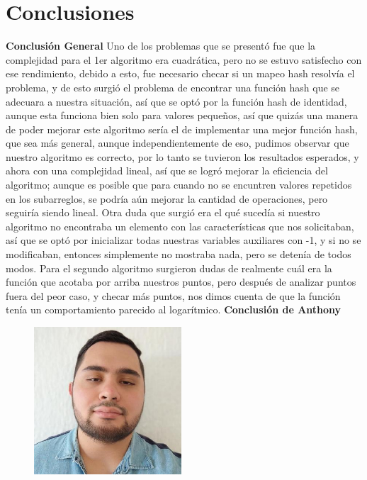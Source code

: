 \documentclass[12pt,twoside]{article}
\begin{document}
\section{Conclusiones}
\textbf{Conclusi\'on General}
\newline
Uno de los problemas que se present\'o fue que la complejidad para el 1er algoritmo era cuadr\'atica, pero no se estuvo satisfecho con ese rendimiento, debido a esto, fue necesario checar si un mapeo hash resolv\'ia el problema, y de esto surgi\'o el problema de encontrar una funci\'on hash 
que se adecuara a nuestra situaci\'on, as\'i que se opt\'o por la funci\'on hash de identidad, aunque esta funciona bien solo para valores pequeños, as\'i que quiz\'as una manera de poder mejorar este algoritmo ser\'ia el de implementar una mejor funci\'on hash, que sea m\'as general, aunque independientemente de eso, pudimos observar que nuestro algoritmo es correcto, por lo tanto se tuvieron los 
resultados esperados, y ahora con una complejidad lineal, as\'i que se logr\'o mejorar la eficiencia del algoritmo; aunque es posible que para cuando no se encuntren valores repetidos en los subarreglos, se podr\'ia a\'un mejorar la cantidad de operaciones, pero seguir\'ia siendo lineal. Otra duda que surgi\'o era el qu\'e suced\'ia si nuestro algoritmo no encontraba un elemento con las caracter\'isticas que nos solicitaban, as\'i que se opt\'o por inicializar todas nuestras variables auxiliares con -1, y si no se modificaban, entonces simplemente no mostraba nada, pero se deten\'ia de todos modos.
Para el segundo algoritmo surgieron dudas de realmente cu\'al era la funci\'on que acotaba por arriba nuestros puntos, pero despu\'es de analizar puntos fuera del peor caso, y checar m\'as puntos, nos dimos cuenta de que la funci\'on ten\'ia un comportamiento parecido al logar\'itmico.
\newpage
\textbf{Conclusi\'on de Anthony}

\begin{figure}
\includegraphics[width=5.5cm]{me.jpg}
\end{figure} 
\end{document}
